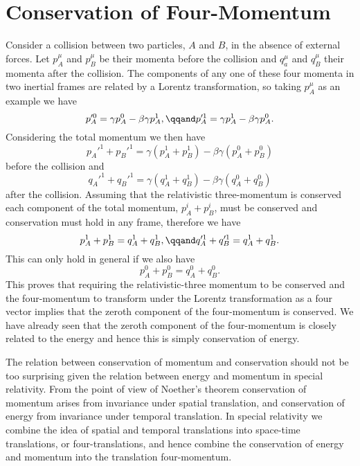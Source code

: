 \documentclass[fleqn]{NotesClass}
\begin{document}
    \section{Conservation of Four-Momentum}
    Consider a collision between two particles, \(A\) and \(B\), in the absence of external forces.
    Let \(p_A^\mu\) and \(p_B^\mu\) be their momenta before the collision and \(q_a^\mu\) and \(q_B^\mu\) their momenta after the collision.
    The components of any one of these four momenta in two inertial frames are related by a Lorentz transformation, so taking \(p_A^\mu\) as an example we have
    \begin{equation}
        p_A'^0 = \gamma p_A^0 - \beta\gamma p_A^1, \qqand p_A'^1 = \gamma p_A^1 - \beta \gamma p_A^0.
    \end{equation}
    Considering the total momentum we then have
    \begin{equation}
        p_A'^1 + p_B'^1 = \gamma(p_A^1 + p_B^1) - \beta\gamma(p_A^0 + p_B^0)
    \end{equation}
    before the collision and
    \begin{equation}
        q_A'^1 + q_B'^1 = \gamma(q_A^1 + q_B^1) - \beta\gamma(q_A^0 + q_B^0)
    \end{equation}
    after the collision.
    Assuming that the relativistic three-momentum is conserved each component of the total momentum, \(p_A^i + p_B^i\), must be conserved and conservation must hold in any frame, therefore we have
    \begin{equation}
        p_A^1 + p_B^1 = q_A^1 + q_B^1, \qqand q_A'^1 + q_B'^1 = q_A^1 + q_B^1.
    \end{equation}
    This can only hold in general if we also have
    \begin{equation}
        p_A^0 + p_B^0 = q_A^0 + q_B^0.
    \end{equation}
    This proves that requiring the relativistic-three momentum to be conserved and the four-momentum to transform under the Lorentz transformation as a four vector implies that the zeroth component of the four-momentum is conserved.
    We have already seen that the zeroth component of the four-momentum is closely related to the energy and hence this is simply conservation of energy.
    
    The relation between conservation of momentum and conservation should not be too surprising given the relation between energy and momentum in special relativity.
    From the point of view of Noether's theorem conservation of momentum arises from invariance under spatial translation, and conservation of energy from invariance under temporal translation.
    In special relativity we combine the idea of spatial and temporal translations into space-time translations, or four-translations, and hence combine the conservation of energy and momentum into the translation four-momentum.
    
\end{document}
